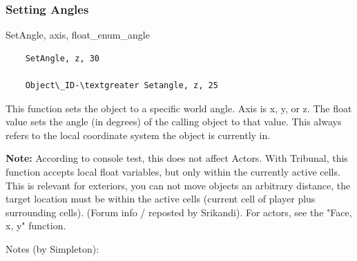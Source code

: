 \hypertarget{setting-angles}{%
\subsubsection{\texorpdfstring{Setting Angles
}{Setting Angles }}\label{setting-angles}}

SetAngle, axis, float\_enum\_angle

\begin{lstlisting}
	SetAngle, z, 30
	
	Object\_ID-\textgreater Setangle, z, 25
\end{lstlisting}

This function sets the object to a specific world angle. Axis is x, y,
or z. The float value sets the angle (in degrees) of the calling object
to that value. This always refers to the local coordinate system the
object is currently in.

\textbf{Note:} According to console test, this does not affect Actors.
With Tribunal, this function accepts local float variables, but only
within the currently active cells. This is relevant for exteriors, you
can not move objects an arbitrary distance, the target location must be
within the active cells (current cell of player plus surrounding cells).
(Forum info / reposted by Srikandi). For actors, see the "Face, x, y"
function.

Notes (by Simpleton):

